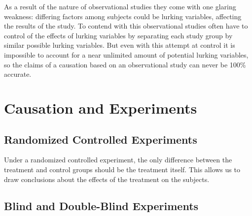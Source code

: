\documentclass[12pt letter]{report}
\begin{document}
As a result of the nature of observational studies they come with one glaring weakness: differing factors among subjects
could be lurking variables, affecting the results of the study. To contend with this observational studies often have to
control of the effects of lurking variables by separating each study group by similar possible lurking variables. But
even with this attempt at control it is impossible to account for a near unlimited amount of potential lurking
variables, so the claims of a causation based on an observational study can never be 100\% accurate.



\section{Causation and Experiments}






\subsection{Randomized Controlled Experiments}


Under a randomized controlled experiment, the only difference between the treatment and control groups should be the
treatment itself. This allows us to draw conclusions about the effects of the treatment on the subjects.

\subsection{Blind and Double-Blind Experiments}


\end{document}
